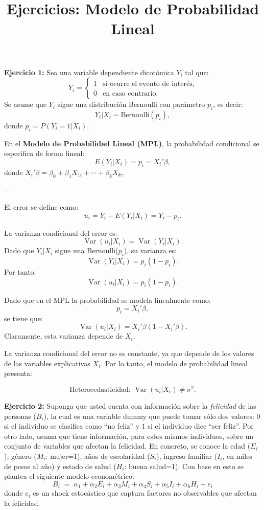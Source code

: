 \documentclass[12pt]{article}
\title{Ejercicios: Modelo de Probabilidad Lineal}
\date{}
\begin{document}
\maketitle



{\bf Ejercicio 1:} Sea una variable dependiente dicotómica \( Y_i \) tal que:
\[
Y_i =
\begin{cases}
1 & \text{si ocurre el evento de interés,} \\
0 & \text{en caso contrario.}
\end{cases}
\]
Se asume que \( Y_i \) sigue una distribución Bernoulli con parámetro \( p_i \), es decir:
\[
Y_i | X_i \sim \text{Bernoulli}(p_i),
\]
donde \( p_i = P(Y_i = 1|X_i) \).

En el \textbf{Modelo de Probabilidad Lineal (MPL)}, la probabilidad condicional se especifica de forma lineal:
\[
E(Y_i|X_i) = p_i = X_i'\beta,
\]
donde \( X_i'\beta = \beta_0 + \beta_1 X_{1i} + \cdots + \beta_k X_{ki} \).

---


El error se define como:
\[
u_i = Y_i - E(Y_i|X_i) = Y_i - p_i.
\]

La varianza condicional del error es:
\[
\operatorname{Var}(u_i|X_i) = \operatorname{Var}(Y_i|X_i).
\]
Dado que \( Y_i|X_i \) sigue una Bernoulli(\(p_i\)), su varianza es:
\[
\operatorname{Var}(Y_i|X_i) = p_i(1 - p_i).
\]
Por tanto:
\[
\boxed{\operatorname{Var}(u_i|X_i) = p_i(1 - p_i)}.
\]



Dado que en el MPL la probabilidad se modela linealmente como:
\[
p_i = X_i'\beta,
\]
se tiene que:
\[
\operatorname{Var}(u_i|X_i) = X_i'\beta(1 - X_i'\beta).
\]
Claramente, esta varianza depende de \( X_i \).

La varianza condicional del error no es constante, ya que depende de los valores de las variables explicativas \( X_i \). Por lo tanto, el modelo de probabilidad lineal presenta:

\[
\boxed{\text{Heterocedasticidad: } \operatorname{Var}(u_i|X_i) \neq \sigma^2.}
\]


{\bf Ejercicio 2:} 
Suponga que usted cuenta con información sobre la \textit{felicidad} de las personas (\(B_i\)), la cual es una variable dummy que puede tomar sólo dos valores: \(0\) si el individuo se clasifica como “no feliz” y \(1\) si el individuo dice “ser feliz”. Por otro lado, asuma que tiene información, para estos mismos individuos, sobre un conjunto de variables que afectan la felicidad. En concreto, se conoce la edad (\(E_i\)), género (\(M_i\): mujer=1), años de escolaridad (\(S_i\)), ingreso familiar (\(I_i\), en miles de pesos al año) y estado de salud (\(H_i\): buena salud=1). Con base en esto se plantea el siguiente modelo econométrico:
\[
B_i \;=\; \alpha_1 + \alpha_2 E_i + \alpha_3 M_i + \alpha_4 S_i + \alpha_5 I_i + \alpha_6 H_i + e_i
\tag{1}
\]
donde \(e_i\) es un shock estocástico que captura factores no observables que afectan la felicidad.
\end{document}
